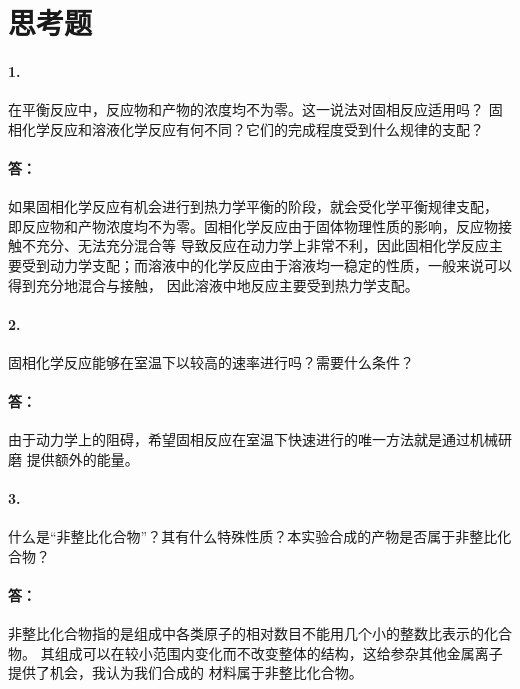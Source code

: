 \documentclass[a4paper,zihao=5,UTF8]{ctexart}
\begin{document}
	\section{思考题}
	\paragraph{1.}在平衡反应中，反应物和产物的浓度均不为零。这一说法对固相反应适用吗？
	固相化学反应和溶液化学反应有何不同？它们的完成程度受到什么规律的支配？
	\paragraph{答：}如果固相化学反应有机会进行到热力学平衡的阶段，就会受化学平衡规律支配，
	即反应物和产物浓度均不为零。固相化学反应由于固体物理性质的影响，反应物接触不充分、无法充分混合等
	导致反应在动力学上非常不利，因此固相化学反应主要受到动力学支配；而溶液中的化学反应由于溶液均一稳定的性质，一般来说可以得到充分地混合与接触，
	因此溶液中地反应主要受到热力学支配。
	\paragraph{2.}固相化学反应能够在室温下以较高的速率进行吗？需要什么条件？
	\paragraph{答：}由于动力学上的阻碍，希望固相反应在室温下快速进行的唯一方法就是通过机械研磨
	提供额外的能量。
	\paragraph{3.}什么是“非整比化合物”？其有什么特殊性质？本实验合成的产物是否属于非整比化合物？
	\paragraph{答：}非整比化合物指的是组成中各类原子的相对数目不能用几个小的整数比表示的化合物。
	其组成可以在较小范围内变化而不改变整体的结构，这给参杂其他金属离子提供了机会，我认为我们合成的
	材料属于非整比化合物。
	
	
\end{document}
